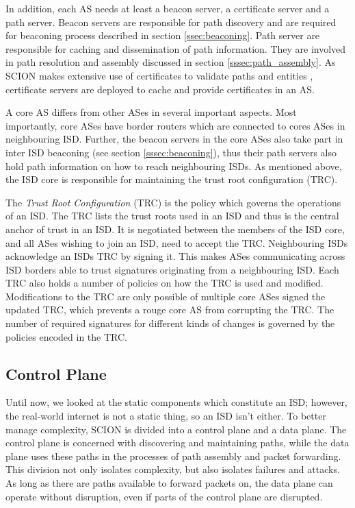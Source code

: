 \documentclass[../eva1_scion.tex]{subfiles}
\begin{document}
    In addition, each AS needs at least a beacon server, a certificate server and a path server. Beacon servers are responsible for path discovery and are required for beaconing process described in section \ref{ssec:beaconing}. Path server are responsible for caching and dissemination of path information. They are involved in path resolution and assembly discussed in section \ref{sssec:path_assembly}. As SCION makes extensive use of certificates to validate paths and entities \cite{scion_2011}, certificate servers are deployed to cache and provide certificates in an AS.

    A core AS differs from other ASes in several important aspects. Most importantly, core ASes have border routers which are connected to cores ASes in neighbouring ISD. Further, the beacon servers in the core ASes also take part in inter ISD beaconing (see section \ref{sssec:beaconing}), thus their path servers also hold path information on how to reach neighbouring ISDs. As mentioned above, the ISD core is responsible for maintaining the trust root configuration (TRC).

    The \textit{Trust Root Configuration} (TRC) is the policy which governs the operations of an ISD. The TRC lists the trust roots used in an ISD and thus is the central anchor of trust in an ISD. It is negotiated between the members of the ISD core, and all ASes wishing to join an ISD, need to accept the TRC. Neighbouring ISDs acknowledge an ISDs TRC by signing it. This makes ASes communicating across ISD borders able to trust signatures originating from a neighbouring ISD. Each TRC also holds a number of policies on how the TRC is used and modified. Modifications to the TRC are only possible of multiple core ASes signed the updated TRC, which prevents a rouge core AS from corrupting the TRC. The number of required signatures for different kinds of changes is governed by the policies encoded in the TRC.

    \subsection{Control Plane} \label{ssec:control_plane}
    Until now, we looked at the static components which constitute an ISD; however, the real-world internet is not a static thing, so an ISD isn't either. To better manage complexity, SCION is divided into a control plane and a data plane. The control plane is concerned with discovering and maintaining paths, while the data plane uses these paths in the processes of path assembly and packet forwarding. This division not only isolates complexity, but also isolates failures and attacks. As long as there are paths available to forward packets on, the data plane can operate without disruption, even if parts of the control plane are disrupted.
\end{document}
